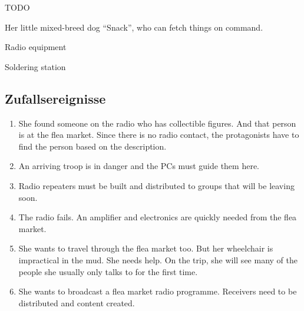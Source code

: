 \begin{npcBox}[title=Antigone]
    \begin{stunts}
    \item {}
    \end{stunts}

    \begin{stressSection}
    \end{stressSection}
    \begin{tabularx}{\textwidth}{ XX }
    \end{tabularx}

    \begin{consequences}
    \item {}
    \item {}
    \item {}
    \end{consequences}

    \begin{npcDescription}
    TODO
    \end{npcDescription}


    \begin{equipment}
    \item Her little mixed-breed dog “Snack”, who can fetch things on command.
    \item Radio equipment
    \item Soldering station
    \end{equipment}
\end{npcBox}

\subsection{Zufallsereignisse}

\begin{enumerate}
\item She found someone on the radio who has collectible figures. And that person is at the flea market. Since there is no radio contact, the protagonists have to find the person based on the description.
\item An arriving troop is in danger and the PCs must guide them here.
\item Radio repeaters must be built and distributed to groups that will be leaving soon.
\item The radio fails. An amplifier and electronics are quickly needed from the flea market.
\item She wants to travel through the flea market too. But her wheelchair is impractical in the mud. She needs help. On the trip, she will see many of the people she usually only talks to for the first time.
\item She wants to broadcast a flea market radio programme. Receivers need to be distributed and content created.
\end{enumerate}

